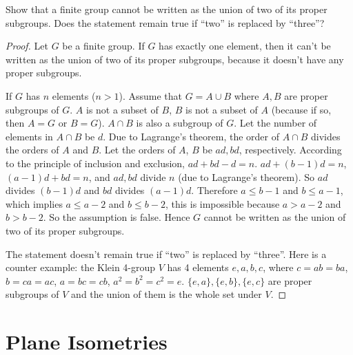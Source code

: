 \begin{exercise}
    Show that a finite group cannot be written as the union of two of its proper subgroups. Does the statement remain true if ``two'' is replaced by ``three''?
\end{exercise}

\begin{proof}
    Let $G$ be a finite group. If $G$ has exactly one element, then it can't be written as the union of two of its proper subgroups, because it doesn't have any proper subgroups.

    If $G$ has $n$ elements ($n > 1$). Assume that $G = A\cup B$ where $A, B$ are proper subgroups of $G$. $A$ is not a subset of $B$, $B$ is not a subset of $A$ (because if so, then $A = G$ or $B = G$). $A\cap B$ is also a subgroup of $G$. Let the number of elements in $A\cap B$ be $d$. Due to Lagrange's theorem, the order of $A\cap B$ divides the orders of $A$ and $B$. Let the orders of $A$, $B$ be $ad, bd$, respectively. According to the principle of inclusion and exclusion, $ad + bd - d = n$. $ad + (b-1)d = n$, $(a-1)d + bd = n$, and $ad, bd$ divide $n$ (due to Lagrange's theorem). So $ad$ divides $(b - 1)d$ and $bd$ divides $(a - 1)d$. Therefore $a\leq b - 1$ and $b\leq a - 1$, which implies $a\leq a - 2$ and $b\leq b - 2$, this is impossible because $a > a - 2$ and $b > b - 2$. So the assumption is false. Hence $G$ cannot be written as the union of two of its proper subgroups.

    The statement doesn't remain true if ``two'' is replaced by ``three''. Here is a counter example: the Klein 4-group $V$ has 4 elements $e, a, b, c$, where $c = ab = ba$, $b = ca = ac$, $a = bc = cb$, $a^{2} = b^{2} = c^{2} = e$. $\{e, a\}, \{e, b\}, \{e, c\}$ are proper subgroups of $V$ and the union of them is the whole set under $V$.
\end{proof}

\section{Plane Isometries}

